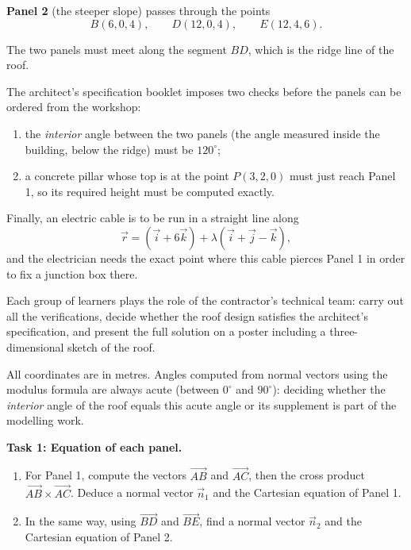 \documentclass[11pt]{article}
\newcounter{popsec}
\newcounter{popsub}
\newcommand{\courssub}[1]{%
  \stepcounter{popsub}%
  \par\vspace{9pt}\noindent{\popxbold\fontsize{11.5}{13}\selectfont\color{popink}{\color{poporange}\thepopsec.\thepopsub}\hspace{6pt}#1}\par\nopagebreak\vspace{4pt}
}
\begin{document}
\textbf{Panel 2} (the steeper slope) passes through the points
\[ B(6,0,4),\qquad D(12,0,4),\qquad E(12,4,6). \]

The two panels must meet along the segment $BD$, which is the ridge line of the roof.

The architect's specification booklet imposes two checks before the panels can be ordered from the workshop:
\begin{enumerate}
\item the \emph{interior} angle between the two panels (the angle measured inside the building, below the ridge) must be $120^\circ$;
\item a concrete pillar whose top is at the point $P(3,2,0)$ must just reach Panel 1, so its required height must be computed exactly.
\end{enumerate}

Finally, an electric cable is to be run in a straight line along
\[ \vec{r} = (\vec{i} + 6\vec{k}) + \lambda(\vec{i} + \vec{j} - \vec{k}), \]
and the electrician needs the exact point where this cable pierces Panel 1 in order to fix a junction box there.

Each group of learners plays the role of the contractor's technical team: carry out all the verifications, decide whether the roof design satisfies the architect's specification, and present the full solution on a poster including a three-dimensional sketch of the roof.

\begin{attention}
All coordinates are in metres. Angles computed from normal vectors using the modulus formula are always acute (between $0^\circ$ and $90^\circ$): deciding whether the \emph{interior} angle of the roof equals this acute angle or its supplement is part of the modelling work.
\end{attention}

\courssub{Tasks}

\textbf{Task 1: Equation of each panel.}
\begin{enumerate}
\item For Panel 1, compute the vectors $\overrightarrow{AB}$ and $\overrightarrow{AC}$, then the cross product $\overrightarrow{AB} \times \overrightarrow{AC}$. Deduce a normal vector $\vec{n}_1$ and the Cartesian equation of Panel 1.
\item In the same way, using $\overrightarrow{BD}$ and $\overrightarrow{BE}$, find a normal vector $\vec{n}_2$ and the Cartesian equation of Panel 2.
\end{enumerate}
\end{document}

